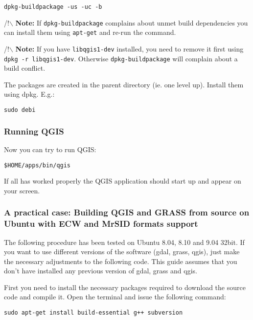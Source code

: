 \begin{verbatim}
dpkg-buildpackage -us -uc -b
\end{verbatim}

/!$\backslash$ \textbf{Note:} If \texttt{dpkg-buildpackage} complains about unmet build dependencies
you can install them using \texttt{apt-get} and re-run the command.

/!$\backslash$ \textbf{Note:} If you have \texttt{libqgis1-dev} installed, you need to remove it first
using \texttt{dpkg -r libqgis1-dev}.  Otherwise \texttt{dpkg-buildpackage} will complain about a
build conflict.

The packages are created in the parent directory (ie. one level up).
Install them using dpkg.  E.g.:

\begin{verbatim}
sudo debi
\end{verbatim}

\hypertarget{toc12}{}
\subsubsection{Running QGIS}
Now you can try to run QGIS:

\begin{verbatim}
$HOME/apps/bin/qgis 
\end{verbatim}

If all has worked properly the QGIS application should start up and appear
on your screen.

\hypertarget{toc13}{}
\subsubsection{A practical case: Building QGIS and GRASS from source on Ubuntu with ECW and MrSID formats support}
The following procedure has been tested on Ubuntu 8.04, 8.10 and 9.04 32bit. If you want 
to use different versions of the software (gdal, grass, qgis), just make the 
necessary adjustments to the following code. This guide assumes that you don't have 
installed any previous version of gdal, grass and qgis.

First you need to install the necessary packages required to download the source 
code and compile it. Open the terminal and issue the following command:

\begin{verbatim}
sudo apt-get install build-essential g++ subversion
\end{verbatim}

